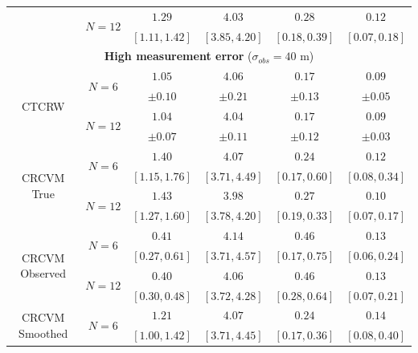 \documentclass[aoas]{imsart}
\theoremstyle{definition}
\theoremstyle{remark}
\theoremstyle{remark}
\newcommand {\1}{\mathbb{1}}
\begin{document}
\begin{table}[ht!]
\begin{tabular}{|c|c|cccc|}
			\\
			& \multirow{2}{4em}{$N=12$} & $1.29$ &
			$4.03$ &
			$0.28$ & $0.12$ 

			\\
			& & $[1.11,1.42]$  &
			$ [3.85,4.20]$ &
			$ [0.18,0.39]$& $[0.07,0.18] $  \\
            \hline
			\multicolumn{6}{|c|}{\textbf{High measurement error} ($\sigma_{obs} =40$ m)} \\
			\hline
            \multirow{4}{6em}{CTCRW} & \multirow{2}{4em}{$N=6$}  & $1.05$ &
			$4.06$ &
			$0.17$ & $0.09$ 
			\\
			& & $\pm 0.10$ &
			$\pm 0.21$ &
			$\pm 0.13$ & 
			$\pm 0.05$ 
			\\
			& \multirow{2}{4em}{$N=12$} & $1.04$ &
			$4.04$ &
			$0.17$ & $0.09$ 
			\\
			& & $\pm 0.07$  &
			$ \pm 0.11$ &
			$ \pm 0.12 $ & $ \pm 0.03$ 
            \\
            \hline
            \multirow{4}{6em}{CRCVM \hspace{0.1cm} True} & \multirow{2}{4em}{$N=6$} & $1.40$ &
			$4.07$ &
			$0.24$ &
			$0.12$
			\\
			& &	$[1.15,1.76]$ &
			$ [3.71,4.49] $&
			$[0.17,0.60]$ & $ [0.08,0.34]$ 
			\\
			& \multirow{2}{4em}{$N=12$} & $1.43$ &
			$3.98$ & $0.27$ & $0.10$
			
			\\
			& & $[1.27,1.60]$ &
			$  [3.78,4.20]$ &
			$ [0.19,0.33]$ &
			$ [0.07,0.17]$ 
			\\
            \hline
            \multirow{4}{6em}{CRCVM Observed} & \multirow{2}{4em}{$N=6$} & $0.41$ &
			$4.14$ &
			$0.46$ &
			$0.13$
			
			\\
			& &	$[0.27,0.61]$ &
			$[3.71,4.57]$&
			$[0.17,0.75]$ & $[0.06,0.24]$ 
			\\
			& \multirow{2}{4em}{$N=12$} & $0.40$ &
			$4.06$ & $0.46$ & $0.13$
			
			\\
			& & $ [0.30,0.48]$ &
			$ [3.72,4.28]$ &
			$[0.28,0.64]$ &
			$[0.07,0.21]$ 
			\\
			\hline	
			\multirow{4}{6em}{CRCVM Smoothed} & \multirow{2}{4em}{$N=6$}  & $1.21$ &
			$4.07 $ &
			$0.24$ & $0.14$ 
			\\
			& & $[1.00,1.42]$ &
			$[3.71,4.45]$ &
			$[0.17,0.36]$ & 
			$[0.08,0.40]$ 
			

\end{tabular}
\end{table}
\end{document}
